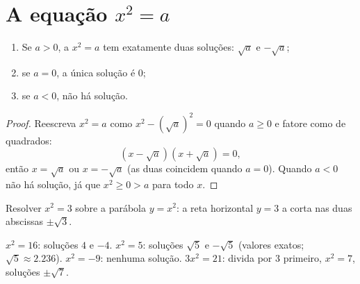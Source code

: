 \section{A equação \texorpdfstring{$x^2 = a$}{x2 = a}}

\begin{theorem}[Resolver $x^2 = a$]\label{thm:g9:sqrt:equation}
\begin{enumerate}
  \item Se $a > 0$, a  $x^2 = a$ tem exatamente duas soluções:
        $\sqrt a$ e $-\sqrt a$;
  \item se $a = 0$, a única solução é $0$;
  \item se $a < 0$, não há solução.
\end{enumerate}
\end{theorem}

\begin{proof}
Reescreva $x^2 = a$ como $x^2 - \left(\sqrt a\right)^2 = 0$ quando
$a \geq 0$ e fatore como  de quadrados:
\[
\left(x - \sqrt a\right)\left(x + \sqrt a\right) = 0 ,
\]
então $x = \sqrt a$ ou $x = -\sqrt a$ (as duas coincidem quando
$a = 0$). Quando $a < 0$ não há solução, já que $x^2 \geq 0 > a$ para
todo $x$.
\end{proof}

\begin{omfigure}

{\small Resolver $x^2 = 3$ sobre a parábola $y = x^2$: a reta
horizontal $y = 3$ a corta nas duas abscissas $\pm\sqrt3$.}
\end{omfigure}

\begin{example}
$x^2 = 16$: soluções $4$ e $-4$. \quad
$x^2 = 5$: soluções $\sqrt5$ e $-\sqrt5$ (valores exatos;
$\sqrt5 \approx 2.236$). \quad
$x^2 = -9$: nenhuma solução. \quad
$3x^2 = 21$: divida por 3 primeiro, $x^2 = 7$, soluções $\pm\sqrt7$.
\end{example}

